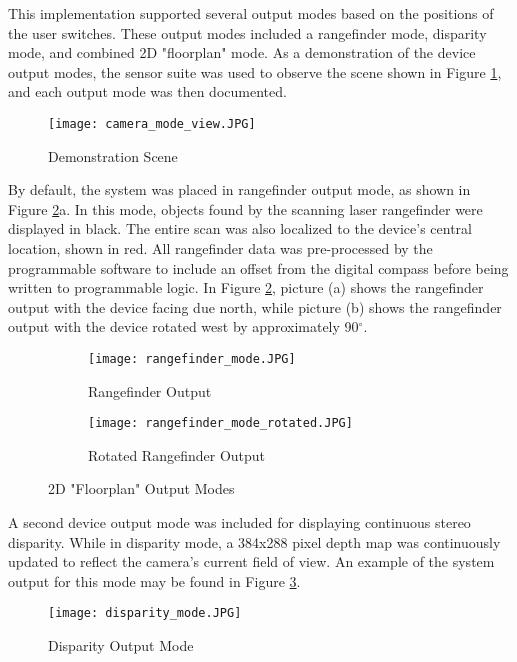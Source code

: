 \par
This implementation supported several output modes based on the positions of the user switches. These output modes included a rangefinder mode, disparity mode, and combined 2D "floorplan" mode. As a demonstration of the device output modes, the sensor suite was used to observe the scene shown in Figure \ref{demoScene}, and each output mode was then documented.
\par
\begin{figure}[H]
	\centerline{
	\texttt{[image: camera\_mode\_view.JPG]}
	}
	\caption{Demonstration Scene}
	\label{demoScene}
\end{figure}
\par
By default, the system was placed in rangefinder output mode, as shown in Figure \ref{rangeOutputs}a. In this mode, objects found by the scanning laser rangefinder were displayed in black. The entire scan was also localized to the device's central location, shown in red. All rangefinder data was pre-processed by the programmable software to include an offset from the digital compass before being written to programmable logic. In Figure \ref{rangeOutputs}, picture (a) shows the rangefinder output with the device facing due north, while picture (b) shows the rangefinder output with the device rotated west by approximately 90$^\circ$.
\par
\begin{figure}[H]
\centering
       \begin{subfigure}[h]{1\textwidth}
            \centerline{\texttt{[image: rangefinder\_mode.JPG]}}
           \caption{Rangefinder Output}
       \end{subfigure}
       \begin{subfigure}[h]{1\textwidth}
           \centerline{\texttt{[image: rangefinder\_mode\_rotated.JPG]}}
           \caption{Rotated Rangefinder Output}
       \end{subfigure}
\caption{2D "Floorplan" Output Modes}
\label{rangeOutputs}
\end{figure}
\par
A second device output mode was included for displaying continuous stereo disparity. While in disparity mode, a 384x288 pixel depth map was continuously updated to reflect the camera's current field of view. An example of the system output for this mode may be found in Figure \ref{disparityOutputs}.
\begin{figure}[H]
        \centerline{\texttt{[image: disparity\_mode.JPG]}}
        \caption{Disparity Output Mode}
        \label{disparityOutputs}
\end{figure}
